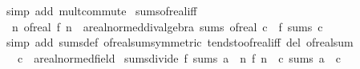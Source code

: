 \begin{isabellebody}
\ {\isacharparenleft}{\kern0pt}simp\ add{\isacharcolon}{\kern0pt}\ mult{\isachardot}{\kern0pt}commute{\isacharparenright}{\kern0pt}%
\endisatagproof
{\isafoldproof}%
%
\isadelimproof
\isanewline
%
\endisadelimproof
\isanewline
{}\isamarkupfalse%
\ sums{\isacharunderscore}{\kern0pt}of{\isacharunderscore}{\kern0pt}real{\isacharunderscore}{\kern0pt}iff{\isacharcolon}{\kern0pt}\isanewline
\ \ {\isachardoublequoteopen}{\isacharparenleft}{\kern0pt}{\isasymlambda}n{\isachardot}{\kern0pt}\ of{\isacharunderscore}{\kern0pt}real\ {\isacharparenleft}{\kern0pt}f\ n{\isacharparenright}{\kern0pt}\ {\isacharcolon}{\kern0pt}{\isacharcolon}{\kern0pt}\ {\isacharprime}{\kern0pt}a{\isacharcolon}{\kern0pt}{\isacharcolon}{\kern0pt}real{\isacharunderscore}{\kern0pt}normed{\isacharunderscore}{\kern0pt}div{\isacharunderscore}{\kern0pt}algebra{\isacharparenright}{\kern0pt}\ sums\ of{\isacharunderscore}{\kern0pt}real\ c\ {\isasymlongleftrightarrow}\ f\ sums\ c{\isachardoublequoteclose}\isanewline
%
\isadelimproof
\ \ %
\endisadelimproof
%
\isatagproof
{}\isamarkupfalse%
\ {\isacharparenleft}{\kern0pt}simp\ add{\isacharcolon}{\kern0pt}\ sums{\isacharunderscore}{\kern0pt}def\ of{\isacharunderscore}{\kern0pt}real{\isacharunderscore}{\kern0pt}sum{\isacharbrackleft}{\kern0pt}symmetric{\isacharbrackright}{\kern0pt}\ tendsto{\isacharunderscore}{\kern0pt}of{\isacharunderscore}{\kern0pt}real{\isacharunderscore}{\kern0pt}iff\ del{\isacharcolon}{\kern0pt}\ of{\isacharunderscore}{\kern0pt}real{\isacharunderscore}{\kern0pt}sum{\isacharparenright}{\kern0pt}%
\endisatagproof
{\isafoldproof}%
%
\isadelimproof
%
\endisadelimproof
%
\isadelimdocument
%
\endisadelimdocument
%
\isatagdocument
%
\isamarkuptrue%
%
\endisatagdocument
{\isafolddocument}%
%
\isadelimdocument
%
\endisadelimdocument
{}\isamarkupfalse%
\isanewline
\ \ \ c\ {\isacharcolon}{\kern0pt}{\isacharcolon}{\kern0pt}\ {\isachardoublequoteopen}{\isacharprime}{\kern0pt}a{\isacharcolon}{\kern0pt}{\isacharcolon}{\kern0pt}real{\isacharunderscore}{\kern0pt}normed{\isacharunderscore}{\kern0pt}field{\isachardoublequoteclose}\isanewline
{}\isanewline
\isanewline
{}\isamarkupfalse%
\ sums{\isacharunderscore}{\kern0pt}divide{\isacharcolon}{\kern0pt}\ {\isachardoublequoteopen}f\ sums\ a\ {\isasymLongrightarrow}\ {\isacharparenleft}{\kern0pt}{\isasymlambda}n{\isachardot}{\kern0pt}\ f\ n\ {\isacharslash}{\kern0pt}\ c{\isacharparenright}{\kern0pt}\ sums\ {\isacharparenleft}{\kern0pt}a\ {\isacharslash}{\kern0pt}\ c{\isacharparenright}{\kern0pt}{\isachardoublequoteclose}\isanewline

\end{isabellebody}
